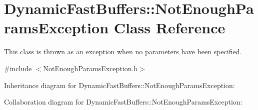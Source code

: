 \hypertarget{class_dynamic_fast_buffers_1_1_not_enough_params_exception}{\section{Dynamic\-Fast\-Buffers\-:\-:Not\-Enough\-Params\-Exception Class Reference}
\label{class_dynamic_fast_buffers_1_1_not_enough_params_exception}
}


This class is thrown as an exception when no parameters have been specified.  




{\ttfamily \#include $<$Not\-Enough\-Params\-Exception.\-h$>$}



Inheritance diagram for Dynamic\-Fast\-Buffers\-:\-:Not\-Enough\-Params\-Exception\-:


Collaboration diagram for Dynamic\-Fast\-Buffers\-:\-:Not\-Enough\-Params\-Exception\-:
